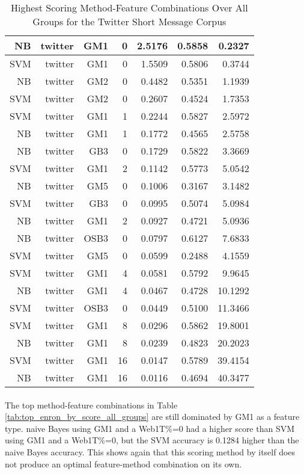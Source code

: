 \begin{table}[htbp!]
\begin{center}
\begin{tabular}{ | r | r | r | r | r | r | r | }
		NB & twitter & GM1 & 0 & 2.5176 & 0.5858 & 0.2327\\ \hline 
		SVM & twitter & GM1 & 0 & 1.5509 & 0.5806 & 0.3744\\ \hline 
		NB & twitter & GM2 & 0 & 0.4482 & 0.5351 & 1.1939\\ \hline 
		SVM & twitter & GM2 & 0 & 0.2607 & 0.4524 & 1.7353\\ \hline 
		SVM & twitter & GM1 & 1 & 0.2244 & 0.5827 & 2.5972\\ \hline 
		NB & twitter & GM1 & 1 & 0.1772 & 0.4565 & 2.5758\\ \hline 
		NB & twitter & GB3 & 0 & 0.1729 & 0.5822 & 3.3669\\ \hline 
		SVM & twitter & GM1 & 2 & 0.1142 & 0.5773 & 5.0542\\ \hline 
		NB & twitter & GM5 & 0 & 0.1006 & 0.3167 & 3.1482\\ \hline 
		SVM & twitter & GB3 & 0 & 0.0995 & 0.5074 & 5.0984\\ \hline 
		NB & twitter & GM1 & 2 & 0.0927 & 0.4721 & 5.0936\\ \hline 
		NB & twitter & OSB3 & 0 & 0.0797 & 0.6127 & 7.6833\\ \hline 
		SVM & twitter & GM5 & 0 & 0.0599 & 0.2488 & 4.1559\\ \hline 
		SVM & twitter & GM1 & 4 & 0.0581 & 0.5792 & 9.9645\\ \hline 
		NB & twitter & GM1 & 4 & 0.0467 & 0.4728 & 10.1292\\ \hline 
		SVM & twitter & OSB3 & 0 & 0.0449 & 0.5100 & 11.3466\\ \hline 
		SVM & twitter & GM1 & 8 & 0.0296 & 0.5862 & 19.8001\\ \hline 
		NB & twitter & GM1 & 8 & 0.0239 & 0.4823 & 20.2023\\ \hline 
		SVM & twitter & GM1 & 16 & 0.0147 & 0.5789 & 39.4154\\ \hline 
		NB & twitter & GM1 & 16 & 0.0116 & 0.4694 & 40.3477\\ \hline 
		\end{tabular}
		\caption{Highest Scoring Method-Feature Combinations Over All Groups for the Twitter Short Message Corpus}
		\label{tab:top_twitter_by_score_all_groups}
	\end{center}
\end{table}

\paragraph*{} The top method-feature combinations in Table \ref{tab:top_enron_by_score_all_groups} are still dominated by GM1 as a feature type.  naive Bayes using GM1 and a Web1T\%=0 had a higher score than SVM using GM1 and a Web1T\%=0, but the SVM accuracy is 0.1284 higher than the naive Bayes accuracy.  This shows again that this scoring method by itself does not produce an optimal feature-method combination on its own.

